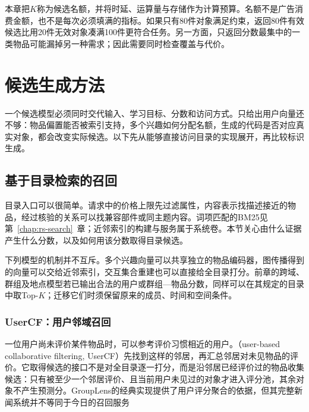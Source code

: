 本章把$K$称为候选名额，并将时延、运算量与存储作为计算预算。名额不是广告消费金额，也不是每次必须填满的指标。如果只有80件对象满足约束，返回80件有效候选比用20件无效对象凑满100件更符合任务。另一方面，只返回分数最集中的一类物品可能漏掉另一种需求；因此需要同时检查覆盖与代价。

\section{候选生成方法}
\label{sec:rs-candidate-methods}

一个候选模型必须同时交代输入、学习目标、分数和访问方式。只给出用户向量还不够：物品偏置能否被索引支持，多个兴趣如何分配名额，生成的代码是否对应真实对象，都会改变实际候选。以下先从能够直接访问目录的实现展开，再比较标识生成。

\subsection{基于目录检索的召回}
\label{sec:rs-directory-retrieval}

目录入口可以很简单。请求中的价格上限先过滤属性，内容表示找描述接近的物品，经过核验的关系可以找兼容部件或同主题内容。词项匹配的BM25见第~\ref{chap:rs-search}~章；近邻索引的构建与服务属于系统卷。本节关心由什么证据产生什么分数，以及如何用该分数取得目录候选。

下列模型的机制并不互斥。多个兴趣向量可以共享独立的物品编码器，图传播得到的向量可以交给近邻索引，交互集合重建也可以直接给全目录打分。前章的跨域、群组及地点模型若已输出合法的用户或群组—物品分数，同样可以在其规定的目录中取Top-$K$；迁移它们时须保留原来的成员、时间和空间条件。

\subsubsection{UserCF：用户邻域召回}
\label{sec:rs-usercf}

一位用户尚未评价某件物品时，可以参考评价习惯相近的用户。（user-based collaborative filtering, UserCF）先找到这样的邻居，再汇总邻居对未见物品的评价。它取得候选的接口不是对全目录逐一打分，而是沿邻居已经评价过的物品收集候选：只有被至少一个邻居评价、且当前用户未见过的对象才进入评分池，其余对象不产生预测分。GroupLens的经典实现提供了用户评分聚合的依据，但其完整新闻系统并不等同于今日的召回服务

